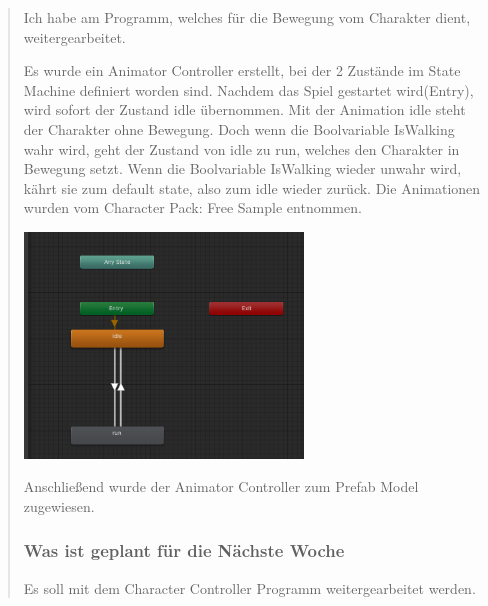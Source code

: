 \begin{quote}
	
	Ich habe am Programm, welches für die Bewegung vom Charakter dient,
	weitergearbeitet.
	
	Es wurde ein Animator Controller erstellt, bei der 2 Zustände im State
	Machine definiert worden sind. Nachdem das Spiel gestartet wird(Entry),
	wird sofort der Zustand idle übernommen. Mit der Animation idle steht
	der Charakter ohne Bewegung. Doch wenn die Boolvariable IsWalking wahr
	wird, geht der Zustand von idle zu run, welches den Charakter in
	Bewegung setzt. Wenn die Boolvariable IsWalking wieder unwahr wird,
	kährt sie zum default state, also zum idle wieder zurück. Die
	Animationen wurden vom Character Pack: Free Sample entnommen.
	\begin{center}
		\includegraphics[frame, height=6cm]{img/SemihSoenmez_IMG/StateMachine_SS_KW41_041021.png}
	\end{center}

	Anschließend wurde der Animator Controller zum Prefab Model zugewiesen.
	
	
	\subsubsection*{Was ist geplant für die Nächste Woche}
	Es soll mit dem Character Controller Programm weitergearbeitet werden.
\end{quote}	

